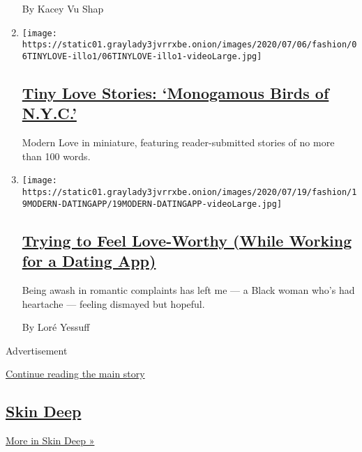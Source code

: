 \begin{enumerate}
  By Kacey Vu Shap
\item
  \texttt{[image: https://static01.graylady3jvrrxbe.onion/images/2020/07/06/fashion/06TINYLOVE-illo1/06TINYLOVE-illo1-videoLarge.jpg]}

  \hypertarget{tiny-love-stories-monogamous-birds-of-nyc}{%
  \subsection{\texorpdfstring{\href{/2020/07/21/style/tiny-modern-love-stories-coronavirus-monogamous-birds-of-nyc.html}{Tiny
  Love Stories: `Monogamous Birds of
  N.Y.C.'}}{Tiny Love Stories: `Monogamous Birds of N.Y.C.'}}\label{tiny-love-stories-monogamous-birds-of-nyc}}

  Modern Love in miniature, featuring reader-submitted stories of no
  more than 100 words.
\item
  \texttt{[image: https://static01.graylady3jvrrxbe.onion/images/2020/07/19/fashion/19MODERN-DATINGAPP/19MODERN-DATINGAPP-videoLarge.jpg]}

  \hypertarget{trying-to-feel-love-worthy-while-working-for-a-dating-app}{%
  \subsection{\texorpdfstring{\href{/2020/07/17/style/modern-love-feel-love-worthy-working-for-dating-app.html}{Trying
  to Feel Love-Worthy (While Working for a Dating
  App)}}{Trying to Feel Love-Worthy (While Working for a Dating App)}}\label{trying-to-feel-love-worthy-while-working-for-a-dating-app}}

  Being awash in romantic complaints has left me --- a Black woman who's
  had heartache --- feeling dismayed but hopeful.

  By Loré Yessuff
\end{enumerate}

Advertisement

\protect\hyperlink{after-mid4}{Continue reading the main story}

\hypertarget{skin-deep-1}{%
\subsection{\texorpdfstring{\href{/column/skin-deep}{Skin
Deep}}{Skin Deep}}\label{skin-deep-1}}

\href{/column/skin-deep}{More in Skin Deep »}

